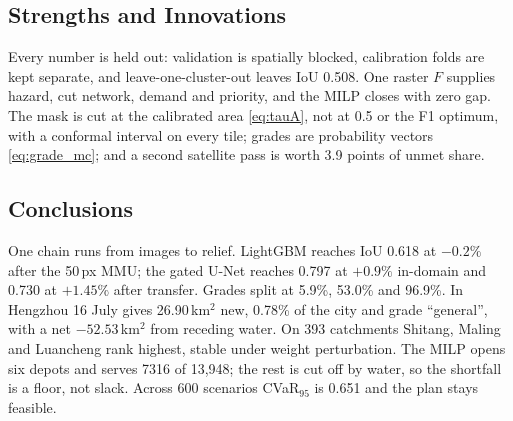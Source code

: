 \subsection{Strengths and Innovations}

Every number is held out: validation is spatially blocked, calibration folds are kept separate, and leave-one-cluster-out leaves IoU 0.508. One raster $F$ supplies hazard, cut network, demand and priority, and the MILP closes with zero gap. The mask is cut at the calibrated area \eqref{eq:tauA}, not at 0.5 or the F1 optimum, with a conformal interval on every tile; grades are probability vectors \eqref{eq:grade_mc}; and a second satellite pass is worth 3.9 points of unmet share.

\subsection{Conclusions}

One chain runs from images to relief. LightGBM reaches IoU 0.618 at $-0.2\%$ after the 50\,px MMU; the gated U-Net reaches 0.797 at $+0.9\%$ in-domain and 0.730 at $+1.45\%$ after transfer. Grades split at 5.9\%, 53.0\% and 96.9\%. In Hengzhou 16 July gives 26.90\,km$^2$ new, 0.78\% of the city and grade ``general'', with a net $-52.53$\,km$^2$ from receding water. On 393 catchments Shitang, Maling and Luancheng rank highest, stable under weight perturbation. The MILP opens six depots and serves 7316 of 13,948; the rest is cut off by water, so the shortfall is a floor, not slack. Across 600 scenarios CVaR$_{95}$ is 0.651 and the plan stays feasible\cite{deepseek2026,qwen2026,doubao2026}.

